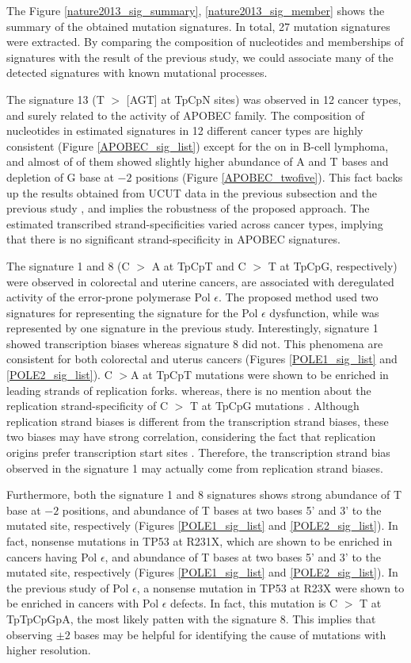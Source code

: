 The Figure \ref{nature2013_sig_summary},  \ref{nature2013_sig_member} shows the summary of the obtained mutation signatures.
In total, 27 mutation signatures were extracted.
By comparing the composition of nucleotides and memberships of signatures with the result of the previous study,
we could associate many of the detected signatures with known mutational processes.

The signature 13 (T $>$ [AGT] at TpCpN sites) was observed in 12 cancer types, and surely related to the activity of APOBEC family.
The composition of nucleotides in estimated signatures in 12 different cancer types are highly consistent (Figure \ref{APOBEC_sig_list}) except for the on in B-cell lymphoma,
and almost of of them showed slightly higher abundance of A and T bases and depletion of G base at $-2$ positions (Figure \ref{APOBEC_twofive}).
This fact backs up the results obtained from UCUT data in the previous subsection and the previous study \cite{pmid23318258},
and implies the robustness of the proposed approach.
The estimated transcribed strand-specificities varied across cancer types, implying that there is no significant strand-specificity in APOBEC signatures.


The signature 1 and 8 (C $>$ A at TpCpT and C $>$ T at TpCpG, respectively) were observed in colorectal and uterine cancers,
are associated with deregulated activity of the error-prone polymerase Pol $\epsilon$.
The proposed method used two signatures for representing the signature for the Pol $\epsilon$ dysfunction, 
while was represented by one signature in the previous study.
Interestingly, signature 1 showed transcription biases whereas signature 8 did not.
This phenomena are consistent for both colorectal and uterus cancers (Figures \ref{POLE1_sig_list} and \ref{POLE2_sig_list}).
C $>$A at TpCpT mutations were shown to be enriched in leading strands of replication forks.
whereas, there is no mention about the replication strand-specificity of C $>$ T at TpCpG mutations \cite{pmid25228659}.
Although replication strand biases is different from the transcription strand biases, these two biases may have strong correlation,
considering the fact that replication origins prefer transcription start sites \cite{pmid23187890}.
Therefore, the transcription strand bias observed in the signature 1 may actually come from replication strand biases.

Furthermore, both the signature 1 and 8 signatures shows strong abundance of T base at $-2$ positions,
and abundance of T bases at two bases 5' and 3' to the mutated site, respectively (Figures \ref{POLE1_sig_list} and \ref{POLE2_sig_list}).
In fact, nonsense mutations in TP53 at R231X, which are shown to be enriched in cancers having Pol $\epsilon$,
and abundance of T bases at two bases 5' and 3' to the mutated site, respectively (Figures \ref{POLE1_sig_list} and \ref{POLE2_sig_list}).
In the previous study of Pol $\epsilon$, a nonsense mutation in TP53 at R23X were shown to be enriched in cancers with Pol $\epsilon$ defects.
In fact, this mutation is C $>$ T at TpTpCpGpA, the most likely patten with the signature 8.
This implies that observing $\pm 2$ bases may be helpful for identifying the cause of mutations with higher resolution.


